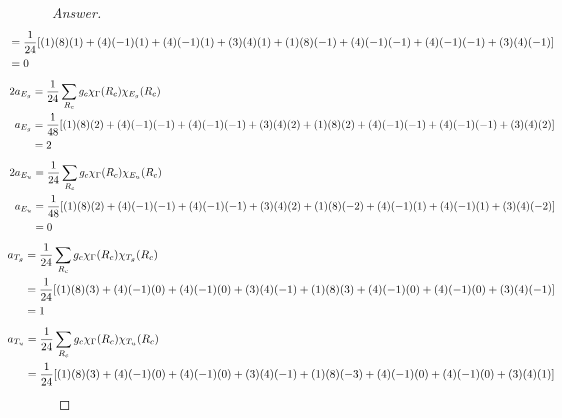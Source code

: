 \documentclass[../psets.tex]{subfiles}
\begin{document}
\begin{enumerate}[label={\Roman*)}]
\begin{enumerate}[label={\alph*)}]
\begin{proof}[Answer]
\begin{align*}
                \hspace{-4em}&= \frac{1}{24}[(1)(8)(1)+(4)(-1)(1)+(4)(-1)(1)+(3)(4)(1)+(1)(8)(-1)+(4)(-1)(-1)+(4)(-1)(-1)+(3)(4)(-1)]\\
                \hspace{-4em}&= 0
            \end{align*}
            \begin{align*}
                \hspace{-4em}2a_{E_g} &= \frac{1}{24}\sum_{R_c}g_c\chi_\Gamma(R_c)\chi_{E_g}(R_c)\\
                \hspace{-4em}a_{E_g} &= \frac{1}{48}[(1)(8)(2)+(4)(-1)(-1)+(4)(-1)(-1)+(3)(4)(2)+(1)(8)(2)+(4)(-1)(-1)+(4)(-1)(-1)+(3)(4)(2)]\\
                \hspace{-4em}&= 2
            \end{align*}
            \begin{align*}
                \hspace{-4em}2a_{E_u} &= \frac{1}{24}\sum_{R_c}g_c\chi_\Gamma(R_c)\chi_{E_u}(R_c)\\
                \hspace{-4em}a_{E_u} &= \frac{1}{48}[(1)(8)(2)+(4)(-1)(-1)+(4)(-1)(-1)+(3)(4)(2)+(1)(8)(-2)+(4)(-1)(1)+(4)(-1)(1)+(3)(4)(-2)]\\
                \hspace{-4em}&= 0
            \end{align*}
            \begin{align*}
                \hspace{-4em}a_{T_g} &= \frac{1}{24}\sum_{R_c}g_c\chi_\Gamma(R_c)\chi_{T_g}(R_c)\\
                \hspace{-4em}&= \frac{1}{24}[(1)(8)(3)+(4)(-1)(0)+(4)(-1)(0)+(3)(4)(-1)+(1)(8)(3)+(4)(-1)(0)+(4)(-1)(0)+(3)(4)(-1)]\\
                \hspace{-4em}&= 1
            \end{align*}
            \begin{align*}
                \hspace{-4em}a_{T_u} &= \frac{1}{24}\sum_{R_c}g_c\chi_\Gamma(R_c)\chi_{T_u}(R_c)\\
                \hspace{-4em}&= \frac{1}{24}[(1)(8)(3)+(4)(-1)(0)+(4)(-1)(0)+(3)(4)(-1)+(1)(8)(-3)+(4)(-1)(0)+(4)(-1)(0)+(3)(4)(1)]\\

\end{align*}
\end{proof}
\end{enumerate}
\end{enumerate}
\end{document}
